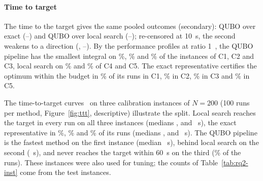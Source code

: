\begin{table}[t]
\centering\small
\caption{The exact class by cell (secondary): the exact representative, the median time of its last improvement
$t_{\mathrm{primal}}$ and the share of its runs certified within the 60~s budget; and the median delay to the first
own solution of each representative in the cold runs (no common start). $^{\dagger}$Descriptive cell.}\label{tab:exact}

\end{table}

\paragraph{Time to target} The time to the target gives the same pooled outcomes (secondary): QUBO over exact
 (--) and QUBO over local search 
(--); re-censored at 10~s, the second weakens to a direction
(, --). By the performance profiles
at ratio 1~\cite{dolan2002benchmarking}, the QUBO pipeline has the smallest integral on \%,
\% and \% of the instances of C1, C2 and C3, local search
on \% and \% of C4 and C5. The exact representative
certifies the optimum within the budget in \% of its runs in C1, \%
in C2, \% in C3 and \% in C5.

The time-to-target curves~\cite{aiex2006ttt} on three calibration instances of $N = 200$ (100 runs per method,
Figure~\ref{fig:ttt}, descriptive) illustrate the split. Local search reaches the target in every run on all three
instances (medians ,  and
~s), the exact representative in \%,
\% and \% of its runs (medians
,  and ~s). The QUBO
pipeline is the fastest method on the first instance (median ~s), behind local search
on the second (~s), and never reaches the target within 60~s on the third
(\% of the runs). These instances were also used for tuning; the counts of
Table~\ref{tab:rq2-inst} come from the test instances.

